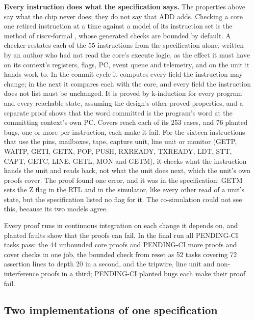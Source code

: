 \documentclass[conference,letterpaper]{IEEEtran}
\begin{document}
\textbf{Every instruction does what the specification says.} The properties above say what
the chip never does; they do not say that ADD adds. Checking a core one retired instruction
at a time against a model of its instruction set is the method of riscv-formal
\cite{riscvformal}, whose generated checks are bounded by default. A checker restates each of the 55
instructions from the specification alone, written by an author who had not read the
core's execute logic, as the effect it must have on its context's registers, flags, PC,
event queue and telemetry, and on the unit it hands work to. In the commit cycle it
computes every field the instruction may change; in the next it compares each with the
core, and every field the instruction does not list must be unchanged. It is proved by
k-induction for every program and every reachable state, assuming the design's other
proved properties, and a separate proof shows that the word committed is the program's
word at the committing context's own PC. Covers reach each of its 253 cases, and 76
planted bugs, one or more per instruction, each make it fail. For the sixteen
instructions that use the pins, mailboxes, tape, capture unit, line unit or monitor
(GETP, WAITP, GETI, GETX, POP, PUSH, RXREADY, TXREADY, LDT, STT, CAPT, GETC, LINE, GETL,
MON and GETM), it
checks what the instruction hands the unit and reads back, not what the unit does next,
which the unit's own proofs cover. The proof found one error, and it was in the
specification: GETM sets the Z flag in the RTL and in the simulator, like every other
read of a unit's state, but the specification listed no flag for it. The co-simulation
could not see this, because its two models agree.

Every proof runs in continuous integration on each change it depends on, and planted
faults show that the proofs can fail. In the final run all PENDING-CI tasks pass: the 44 unbounded core proofs and PENDING-CI more proofs and cover checks in one job, the bounded check from reset as 52 tasks covering 72 assertion lines to depth 20 in a second, and the tripwire, line unit and non-interference proofs in a third; PENDING-CI planted bugs each make their proof fail.

\subsection{Two implementations of one specification}
\end{document}
